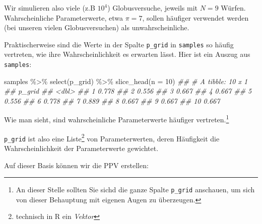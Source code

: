 \documentclass[
  a4paper,
  DIV=11]{scrreprt}
\newenvironment{Shaded}{\begin{snugshade}}{\end{snugshade}}
\newcommand{\AttributeTok}[1]{\textcolor[rgb]{0.40,0.45,0.13}{#1}}
\newcommand{\DecValTok}[1]{\textcolor[rgb]{0.68,0.00,0.00}{#1}}
\newcommand{\DocumentationTok}[1]{\textcolor[rgb]{0.37,0.37,0.37}{\textit{#1}}}
\newcommand{\FloatTok}[1]{\textcolor[rgb]{0.68,0.00,0.00}{#1}}
\newcommand{\FunctionTok}[1]{\textcolor[rgb]{0.28,0.35,0.67}{#1}}
\newcommand{\NormalTok}[1]{\textcolor[rgb]{0.00,0.23,0.31}{#1}}
\newcommand{\OtherTok}[1]{\textcolor[rgb]{0.00,0.23,0.31}{#1}}
\newcommand{\SpecialCharTok}[1]{\textcolor[rgb]{0.37,0.37,0.37}{#1}}
\theoremstyle{definition}
\theoremstyle{remark}
\begin{document}
Wir simulieren also viele (z.B \(10^4\)) Globusversuche, jeweils mit
\(N=9\) Würfen. Wahrscheinliche Parameterwerte, etwa \(\pi=7\), sollen
häufiger verwendet werden (bei unseren vielen Globusversuchen) als
unwahrscheinliche.

Praktischerweise sind die Werte in der Spalte \texttt{p\_grid} in
\texttt{samples} so häufig vertreten, wie ihre Wahrscheinlichkeit es
erwarten lässt. Hier ist ein Auszug aus \texttt{samples}:

\begin{Shaded}
\begin{Highlighting}[]
\NormalTok{samples }\SpecialCharTok{\%\textgreater{}\%} 
  \FunctionTok{select}\NormalTok{(p\_grid) }\SpecialCharTok{\%\textgreater{}\%} 
  \FunctionTok{slice\_head}\NormalTok{(}\AttributeTok{n =} \DecValTok{10}\NormalTok{)}
\DocumentationTok{\#\# \# A tibble: 10 x 1}
\DocumentationTok{\#\#    p\_grid}
\DocumentationTok{\#\#     \textless{}dbl\textgreater{}}
\DocumentationTok{\#\#  1  0.778}
\DocumentationTok{\#\#  2  0.556}
\DocumentationTok{\#\#  3  0.667}
\DocumentationTok{\#\#  4  0.667}
\DocumentationTok{\#\#  5  0.556}
\DocumentationTok{\#\#  6  0.778}
\DocumentationTok{\#\#  7  0.889}
\DocumentationTok{\#\#  8  0.667}
\DocumentationTok{\#\#  9  0.667}
\DocumentationTok{\#\# 10  0.667}
\end{Highlighting}
\end{Shaded}

Wie man sieht, sind wahrscheinliche Parameterwerte häufiger
vertreten.\footnote{An dieser Stelle sollten Sie sichd die ganze Spalte
  \texttt{p\_grid} anschauen, um sich von dieser Behauptung mit eigenen
  Augen zu überzeugen.}

\texttt{p\_grid} ist also eine Liste\footnote{technisch in R ein
  \emph{Vektor}} von Parameterwerten, deren Häufigkeit die
Wahrscheinlichkeit der Parameterwerte gewichtet.

Auf dieser Basis können wir die PPV erstellen:

\begin{Shaded}
\end{Shaded}
\end{document}
